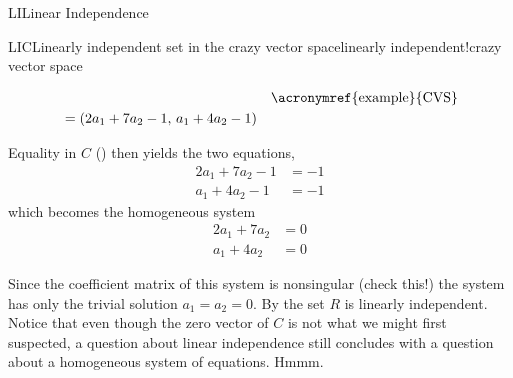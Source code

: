 \begin{subsect}{LI}{Linear Independence}
\begin{example}{LIC}{Linearly independent set in the crazy vector space}{linearly independent!crazy vector space}
\begin{para}
\begin{align*}
&&\text{\acronymref{example}{CVS}}\\
%
&=(2a_1+7a_2-1,\,a_1+4a_2-1)
\end{align*}
\end{para}
%
\begin{para}Equality in $C$ () then yields the two equations,
%
\begin{align*}
2a_1+7a_2-1&=-1\\
a_1+4a_2-1&=-1
\end{align*}
%
which becomes the homogeneous system
%
\begin{align*}
2a_1+7a_2&=0\\
a_1+4a_2&=0
\end{align*}
\end{para}
%
\begin{para}Since the coefficient matrix of this system is nonsingular (check this!) the system has only the trivial solution $a_1=a_2=0$.  By  the set $R$ is linearly independent.  Notice that even though the zero vector of $C$ is not what we might first suspected, a question about linear independence still concludes with a question about a homogeneous system of equations.  Hmmm.\end{para}
%
\end{example}
%
\end{subsect}
%
